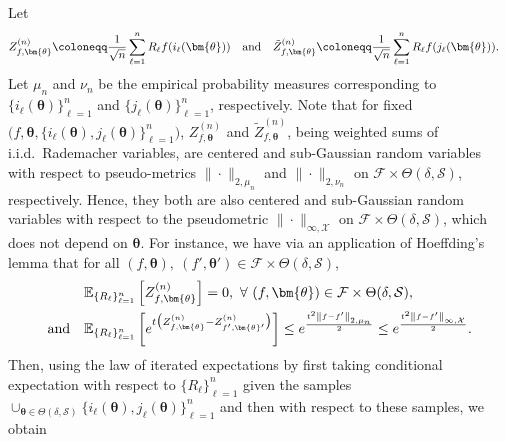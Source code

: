 \documentclass[a4paper,onecolumn,11pt,accepted=2026-05-12]{quantumarticle}
\newcommand{\norm}[1]{\left\Vert#1\right\Vert}
\newcommand{\cF}{\mathcal{F}}
\newcommand{\cS}{\mathcal{S}}
\newcommand{\cX}{\mathcal{X}}
\newcommand{\EE}{\mathbb{E}}
\begin{document}
Let 
\begin{align}
    & Z^{(n)}_{f,\bm{\theta}}\coloneqq  \frac{1}{\sqrt{n}}\sum_{\ell=1}^{n}R_{\ell} f(i_\ell(\bm{\theta})) \quad \text{and} \quad  \tilde Z^{(n)}_{f,\bm{\theta}}\coloneqq    \frac{1}{\sqrt{n}}\sum_{\ell=1}^{n}R_{\ell} f(j_\ell(\bm{\theta})). \notag  
\end{align}
Let  $\mu_n$ and $\nu_n $ be the empirical probability measures corresponding to $\{i_{\ell}(\bm{\theta})\}_{\ell=1}^n$ and $\{j_{\ell}(\bm{\theta}) \}_{\ell=1}^n$, respectively. 
Note that  for fixed $\big (f,\bm{\theta},\{i_{\ell}(\bm{\theta}),j_{\ell}(\bm{\theta})\}_{\ell=1}^n\big)$, $Z^{(n)}_{f,\bm{\theta}}$ and $\tilde Z^{(n)}_{f,\bm{\theta}}$, being weighted sums of i.i.d.~Rademacher variables,  are centered and sub-Gaussian random variables  with respect to  pseudo-metrics $\|\cdot\|_{2,\mu_n}$ and $\|\cdot\|_{2,\nu_n}$ on $\cF \times \Theta(\delta,\cS)$, respectively. Hence, they both  are also centered and sub-Gaussian random variables  with respect to the pseudometric $\|\cdot\|_{\infty,\cX}$ on $\cF \times \Theta(\delta,\cS)$, which does not depend on $\bm{\theta}$. For instance, we have via an application of Hoeffding's lemma that for all $(f,\bm{\theta}),~(f',\bm{\theta}') \in \cF \times \Theta(\delta,\cS)$,
\begin{align}
& \EE_{\{R_{\ell}\}_{\ell=1}^n}\left[ Z^{(n)}_{f,\bm{\theta}}\right]=0,~\forall~(f,\bm{\theta}) \in \cF \times \Theta(\delta,\cS), \notag \\
 \text{and}  \quad & \EE_{\{R_{\ell}\}_{\ell=1}^n}\left[ e^{t\big(Z^{(n)}_{f,\bm{\theta}}-Z^{(n)}_{f',\bm{\theta}'}\big)}\right] \leq e^{\frac{t^2 \norm{f-f'}_{2,\mu_n}}{2}} \leq e^{\frac{t^2 \norm{f-f'}_{\infty,\cX}}{2}}. \notag 
\end{align}
Then, using the law of iterated expectations by first taking conditional expectation with respect to $\{R_{\ell}\}_{\ell=1}^n$ given the samples $\cup_{\bm{\theta} \in \Theta(\delta,\cS)} \{i_{\ell}(\bm{\theta}),j_{\ell}(\bm{\theta})\}_{\ell=1}^n$ and then with respect to these samples,  we obtain
\end{document}
